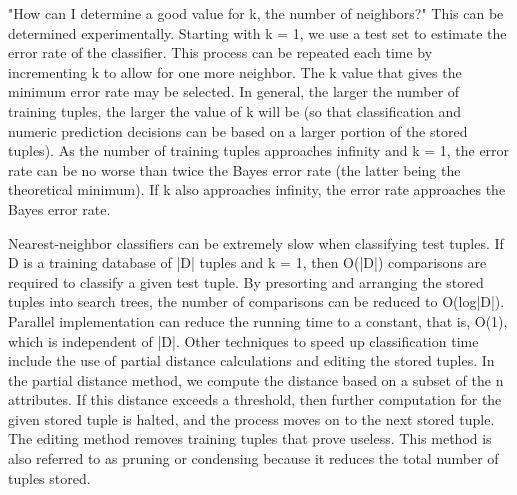 "How can I determine a good value for k, the number of neighbors?" This can be determined experimentally. Starting with k = 1, we use a test set to estimate the error rate
of the classifier. This process can be repeated each time by incrementing k to allow for one more neighbor. The k value that gives the minimum error rate may be selected. In
general, the larger the number of training tuples, the larger the value of k will be (so that classification and numeric prediction decisions can be based on a larger portion of the stored tuples). As the number of training tuples approaches infinity and k = 1, the error rate can be no worse than twice the Bayes error rate (the latter being the theoretical minimum). If k also approaches infinity, the error rate approaches the Bayes error rate.\bigskip

Nearest-neighbor classifiers can be extremely slow when classifying test tuples. If D is a training database of |D| tuples and k = 1, then O(|D|) comparisons are required to
classify a given test tuple. By presorting and arranging the stored tuples into search trees, the number of comparisons can be reduced to O(log|D|). Parallel implementation can
reduce the running time to a constant, that is, O(1), which is independent of |D|. Other techniques to speed up classification time include the use of partial distance
calculations and editing the stored tuples. In the partial distance method, we compute the distance based on a subset of the n attributes. If this distance exceeds a threshold,
then further computation for the given stored tuple is halted, and the process moves on to the next stored tuple. The editing method removes training tuples that prove useless. This method is also referred to as pruning or condensing because it reduces the total
number of tuples stored.\bigskip
